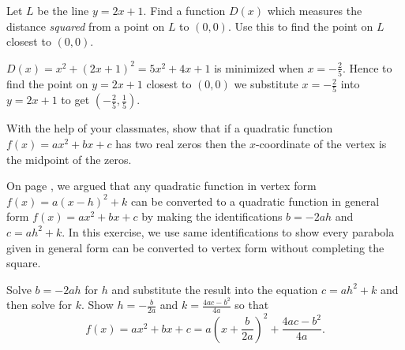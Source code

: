 \documentclass{ximera}
\begin{document}
\begin{problem}
Let $L$ be the line $y = 2x+1$.  Find a function $D(x)$ which measures the distance \textit{squared} from a point on $L$ to $(0,0)$.  Use this to find the point on $L$ closest to $(0,0)$.

\begin{solution}
    $D(x) = x^2 + (2x+1)^2 = 5x^2+4x+1$ is minimized when $x=-\frac{2}{5}$.  Hence to find the  point on $y=2x+1$ closest to $(0,0)$ we substitute $x = -\frac{2}{5}$ into  $y=2x+1$ to get $\left(-\frac{2}{5}, \frac{1}{5}\right)$.
\end{solution}

\end{problem}

\begin{problem}
With the help of your classmates, show that if a quadratic function $f(x) = ax^{2} + bx + c$ has two real zeros then the $x$-coordinate of the vertex is the midpoint of the zeros.
\end{problem}

\begin{problem}\label{avoidcompsquare}
On page \pageref{standardtogeneraldiscussion}, we argued that any quadratic function in vertex form $f(x) = a(x-h)^2+k$ can be converted to a quadratic function in general form $f(x) = ax^2+bx+c$ by making the identifications $b=-2ah$ and $c = ah^2+k$.  In this exercise, we use same identifications to show every parabola given in general form can be converted to vertex form without completing the square.

\smallskip

Solve $b=-2ah$ for $h$ and substitute the result into the equation $c = ah^2+k$ and then solve for $k$.  Show  $h = -\frac{b}{2a}$ and $k = \frac{4ac-b^2}{4a}$ so that \[ f(x) = ax^2+bx+c = a\left(x + \frac{b}{2a}\right)^2  + \frac{4ac - b^2}{4a}. \]
\end{problem}
\end{document}
